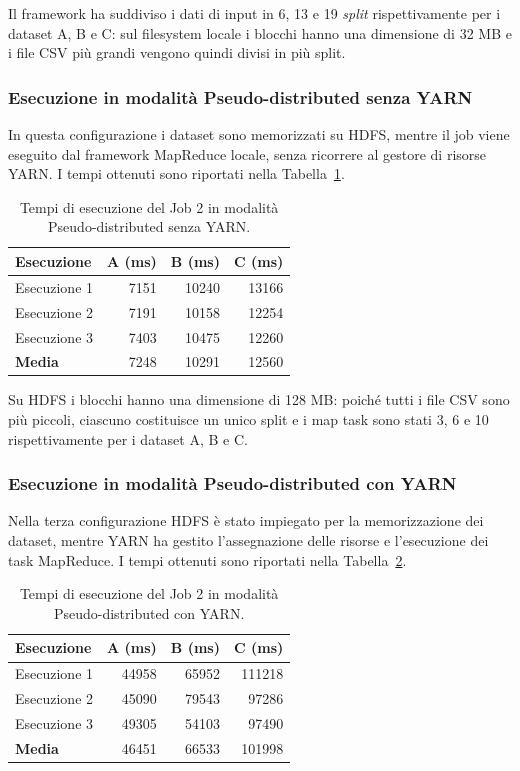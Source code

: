 \documentclass[12pt, a4paper]{article}
\begin{document}
Il framework ha suddiviso i dati di input
in 6, 13 e 19 \textit{split} rispettivamente
per i dataset A, B e C: sul filesystem locale
i blocchi hanno una dimensione di 32 MB e i file
CSV più grandi vengono quindi divisi in più split.

\subsubsection{Esecuzione in modalità
Pseudo-distributed senza YARN}

In questa configurazione i dataset sono memorizzati
su HDFS, mentre il job viene eseguito dal framework
MapReduce locale, senza ricorrere al gestore di risorse YARN.
I tempi ottenuti sono riportati nella
Tabella~\ref{tab:job2pd}.

\begin{table}[H]
\centering
\small
\begin{tabular}{|l|r|r|r|}
\hline
\textbf{Esecuzione} &
\textbf{A (ms)} &
\textbf{B (ms)} &
\textbf{C (ms)} \\
\hline
Esecuzione 1 & 7151 & 10240 & 13166 \\
Esecuzione 2 & 7191 & 10158 & 12254 \\
Esecuzione 3 & 7403 & 10475 & 12260 \\
\hline
\textbf{Media} & 7248 & 10291 & 12560 \\
\hline
\end{tabular}
\caption{Tempi di esecuzione del Job 2 in modalità Pseudo-distributed senza YARN.}
\label{tab:job2pd}
\end{table}

Su HDFS i blocchi hanno una dimensione di 128 MB:
poiché tutti i file CSV sono più piccoli, ciascuno
costituisce un unico split e i map task sono stati
3, 6 e 10 rispettivamente per i dataset A, B e C.

\subsubsection{Esecuzione in modalità
Pseudo-distributed con YARN}

Nella terza configurazione HDFS è stato impiegato
per la memorizzazione dei dataset, mentre YARN
ha gestito l'assegnazione delle risorse
e l'esecuzione dei task MapReduce.
I tempi ottenuti sono riportati nella
Tabella~\ref{tab:job2yarn}.

\begin{table}[H]
\centering
\small
\begin{tabular}{|l|r|r|r|}
\hline
\textbf{Esecuzione} &
\textbf{A (ms)} &
\textbf{B (ms)} &
\textbf{C (ms)} \\
\hline
Esecuzione 1 & 44958 & 65952 & 111218 \\
Esecuzione 2 & 45090 & 79543 & 97286 \\
Esecuzione 3 & 49305 & 54103 & 97490 \\
\hline
\textbf{Media} & 46451 & 66533 & 101998 \\
\hline
\end{tabular}
\caption{Tempi di esecuzione del Job 2 in modalità Pseudo-distributed con YARN.}
\label{tab:job2yarn}
\end{table}
\end{document}
